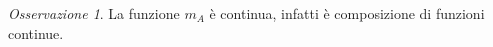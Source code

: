 \documentclass[a4paper,10pt]{article}
\newcounter{counter1}
\theoremstyle{plain}
\theoremstyle{definition}
\theoremstyle{remark}
\newtheorem{myoss}[counter1]{Osservazione}
\newcommand{\set}[1]{\left\{#1\right\}}
\newcommand{\pa}[1]{\left(#1\right)}
\newcommand{\abs}[1]{\left|#1\right|}
\begin{document}
\begin{myoss}
  La funzione $m_A$ è continua, infatti è composizione di funzioni
  continue.
\end{myoss}




\end{document}
